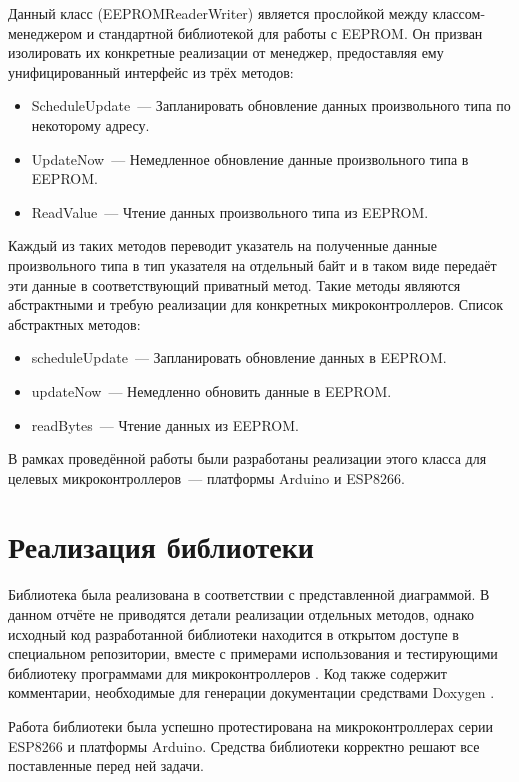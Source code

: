 Данный класс (EEPROMReaderWriter) является прослойкой между классом-менеджером и стандартной библиотекой для работы с EEPROM.
Он призван изолировать их конкретные реализации от менеджер, предоставляя ему унифицированный интерфейс из трёх методов:

\begin{itemize}
	\item ScheduleUpdate~--- Запланировать обновление данных произвольного типа по некоторому адресу.
	\item UpdateNow~---	Немедленное обновление данные произвольного типа в EEPROM.
	\item ReadValue~--- Чтение данных произвольного типа из EEPROM.
\end{itemize}

Каждый из таких методов переводит указатель на полученные данные произвольного типа в тип указателя на отдельный байт и в таком виде передаёт эти данные в соответствующий приватный метод.
Такие методы являются абстрактными и требую реализации для конкретных микроконтроллеров.
Список абстрактных методов:
\begin{itemize}
	\item scheduleUpdate~--- Запланировать обновление данных в EEPROM.
	\item updateNow~--- Немедленно обновить данные в EEPROM.
	\item readBytes~---	Чтение данных из EEPROM.
\end{itemize}

В рамках проведённой работы были разработаны реализации этого класса для целевых микроконтроллеров~--- платформы Arduino и ESP8266.


\section{Реализация библиотеки}

Библиотека была реализована в соответствии с представленной диаграммой.
В данном отчёте не приводятся детали реализации отдельных методов, однако исходный код разработанной библиотеки находится в открытом доступе в специальном репозитории, вместе с примерами использования и тестирующими библиотеку программами для микроконтроллеров \cite{web:my-eemanager}.
Код также содержит комментарии, необходимые для генерации документации средствами Doxygen \cite{web:doxygen}.

Работа библиотеки была успешно протестирована на микроконтроллерах серии ESP8266 и платформы Arduino.
Средства библиотеки корректно решают все поставленные перед ней задачи.
